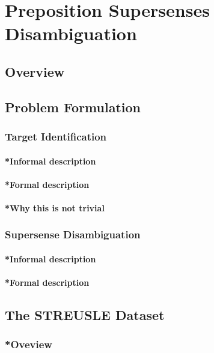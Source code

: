 
\chapter{Preposition Supersenses Disambiguation} %

\label{Chapter2} %

\section{Overview}

\section{Problem Formulation}
\subsection{Target Identification}
\subsubsection{*Informal description}
\subsubsection{*Formal description}
\subsubsection{*Why this is not trivial}
\subsection{Supersense Disambiguation}
\subsubsection{*Informal description}
\subsubsection{*Formal description}

\section{The STREUSLE Dataset}
\subsection{*Oveview}
